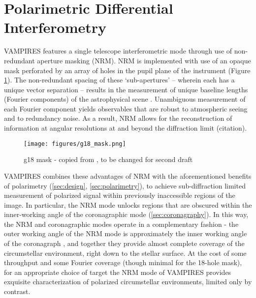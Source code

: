 \section{Polarimetric Differential Interferometry}\label{sec:interferometry}


 
 

VAMPIRES features a single telescope interferometric mode through use of non-redundant aperture masking (NRM). NRM is implemented with use of an opaque mask perforated by an array of holes in the pupil plane of the instrument (Figure \ref{fig:g18_mask}). The non-redundant spacing of these `sub-apertures' -- wherein each has a unique vector separation -- results in the measurement of unique baseline lengths (Fourier components) of the astrophysical scene \citep{tuthill_aperture_2000}. Unambiguous measurement of each Fourier component yields observables that are robust to atmospheric seeing and to redundancy noise. As a result, NRM allows for the reconstruction of information at angular resolutions at and beyond the diffraction limit (citation).


\begin{figure}[h!]
\centering
\texttt{[image: figures/g18\_mask.png]}
    \caption{\label{fig:g18_mask} g18 mask - copied from \citep{norris_vampires_2015}, to be changed for second draft}
\end{figure}


VAMPIRES combines these advantages of NRM with the aforementioned benefits of polarimetry (\autoref{sec:design}, \autoref{sec:polarimetry}), to achieve sub-diffraction limited measurement of polarized signal within previously inaccessible regions of the image. In particular, the NRM mode unlocks regions that are obscured within the inner-working angle of the coronagraphic mode (\autoref{sec:coronagraphy}). In this way, the NRM and coronagraphic modes operate in a complementary fashion - the outer working angle of the NRM mode is approximately the inner working angle of the coronagraph \citep{norris_vampires_2015}, and together they provide almost complete coverage of the circumstellar environment, right down to the stellar surface. At the cost of some throughput and some Fourier coverage (though minimal for the 18-hole mask), for an appropriate choice of target the NRM mode of VAMPIRES provides exquisite characterization of polarized circumstellar environments, limited only by contrast.


